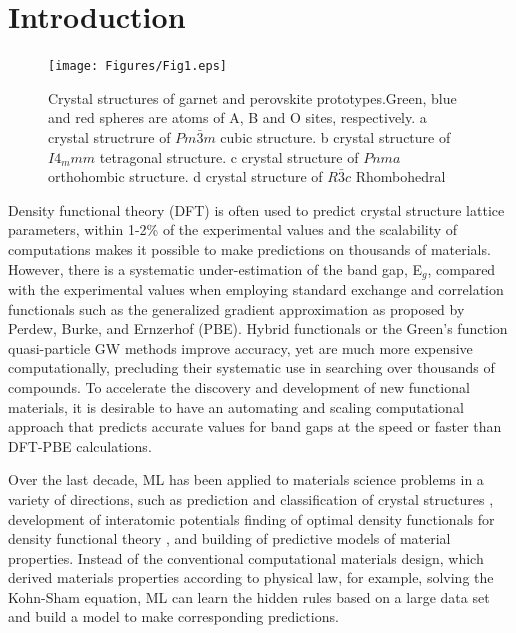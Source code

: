 \documentclass[%
reprint,
superscriptaddress,
citeautoscript,
 amsmath,amssymb,
 aps,
 prl,
floatfix,
]{revtex4-1}
\begin{document}
\maketitle


\section{Introduction}
 
 \begin{figure}[ht]
\begin{center}
\texttt{[image: Figures/Fig1.eps]}
\end{center}
\caption{ Crystal structures of garnet and perovskite prototypes.Green, blue and red spheres are atoms of A, B and O sites, respectively. a crystal structrure of $Pm\bar{3}m$ cubic structure. b crystal structure of $I4_mmm$ tetragonal structure. c crystal structure of $Pnma$ orthohombic structure. d crystal structure of $R\bar{3}c$ Rhombohedral 
}
\label{fig1}
\end{figure}

Density functional theory (DFT)\cite{Kohn1964,Kohn1965}  is often used to predict crystal structure lattice parameters, within 1-2\% of the experimental values and the scalability of computations makes it possible to make predictions on thousands of materials.  However, there is a systematic under-estimation of the band gap, E$_g$, compared with the experimental values when employing standard exchange and correlation functionals such as the generalized gradient approximation as proposed by Perdew, Burke, and Ernzerhof (PBE).  Hybrid functionals  \cite{Heyd2003,Heyd2006} or the Green’s function quasi-particle GW methods \cite{Luoie1996,Kresse2006} improve accuracy, yet are much more expensive computationally, precluding their systematic use in searching over thousands of compounds. To accelerate the discovery and development of new functional materials, it is desirable to have an automating and scaling computational approach that predicts accurate values for band gaps at the speed or faster than DFT-PBE calculations. 

Over the last decade, ML has been applied to materials science problems in a variety of directions, such as prediction and classification of crystal structures\cite{Fischer2006,CARR2009339,Pilania2015,Yamashita2018} , development of interatomic potentials \cite{Hobday1999,Handley2010,Schneider2017} finding of optimal density functionals for density functional theory \cite{Wellendorff2012,Snyder2012,Brockherde2017,Pilania2013}, and building of predictive models of material properties\cite{Pilania2013,Lee2016,Pilania2016,Bart2017}. Instead of the conventional computational materials design, which derived materials properties according to physical law, for example, solving the Kohn-Sham equation, ML can learn the hidden rules based on a large data set and build a model to make corresponding predictions. 
\end{document}

